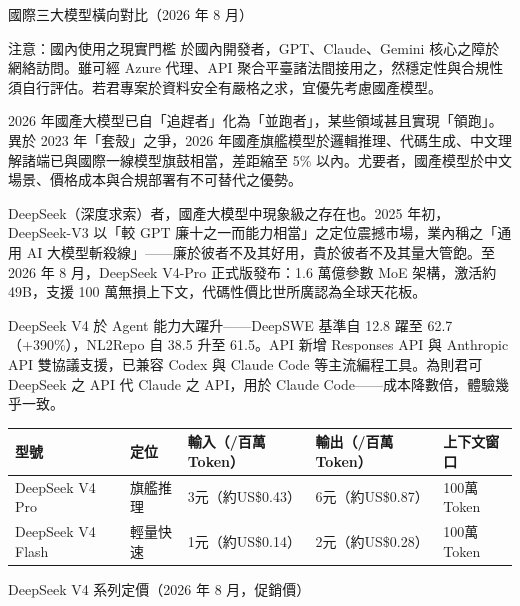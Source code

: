 \begin{center}\small\color{gray}國際三大模型橫向對比（2026 年 8 月）\end{center}

\begin{tcbwarn}{注意：國內使用之現實門檻}
於國內開發者，GPT、Claude、Gemini 核心之障於網絡訪問。雖可經 Azure 代理、API 聚合平臺諸法間接用之，然穩定性與合規性須自行評估。若君專案於資料安全有嚴格之求，宜優先考慮國產模型。

\end{tcbwarn}


2026 年國產大模型已自「追趕者」化為「並跑者」，某些領域甚且實現「領跑」。異於 2023 年「套殼」之爭，2026 年國產旗艦模型於邏輯推理、代碼生成、中文理解諸端已與國際一線模型旗鼓相當，差距縮至 5\% 以內。尤要者，國產模型於中文場景、價格成本與合規部署有不可替代之優勢。


DeepSeek（深度求索）者，國產大模型中現象級之存在也。2025 年初，DeepSeek-V3 以「較 GPT 廉十之一而能力相當」之定位震撼市場，業內稱之「通用 AI 大模型斬殺線」——廉於彼者不及其好用，貴於彼者不及其量大管飽。至 2026 年 8 月，DeepSeek V4-Pro 正式版發布：1.6 萬億參數 MoE 架構，激活約 49B，支援 100 萬無損上下文，代碼性價比世所廣認為全球天花板。

DeepSeek V4 於 Agent 能力大躍升——DeepSWE 基準自 12.8 躍至 62.7（+390\%），NL2Repo 自 38.5 升至 61.5。API 新增 Responses API 與 Anthropic API 雙協議支援，已兼容 Codex 與 Claude Code 等主流編程工具。為則君可 DeepSeek 之 API 代 Claude 之 API，用於 Claude Code——成本降數倍，體驗幾乎一致。

\begin{center}
\begin{tabularx}{\linewidth}{|X|X|X|X|X|}
\hline
\textbf{型號} & \textbf{定位} & \textbf{輸入（/百萬Token）} & \textbf{輸出（/百萬Token）} & \textbf{上下文窗口} \tabularnewline
\hline
DeepSeek V4 Pro & 旗艦推理 & 3元（約US\$0.43） & 6元（約US\$0.87） & 100萬Token \tabularnewline
DeepSeek V4 Flash & 輕量快速 & 1元（約US\$0.14） & 2元（約US\$0.28） & 100萬Token \tabularnewline
\hline
\end{tabularx}
\end{center}

\begin{center}\small\color{gray}DeepSeek V4 系列定價（2026 年 8 月，促銷價）\end{center}

